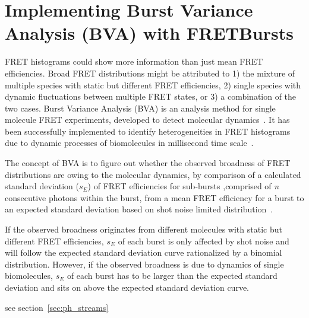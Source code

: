 \section{Implementing Burst Variance Analysis (BVA) with FRETBursts}

FRET histograms could show more information than just mean FRET efficiencies. Broad FRET distributions might be attributed to 1) the mixture of multiple species with static but different FRET efficiencies, 2) single species with dynamic fluctuations between multiple FRET states, or 3) a combination of the two cases. Burst Variance Analysis (BVA) is an analysis method for single molecule FRET experiments, developed to detect molecular dynamics~\cite{Torella_2011}. It has been successfully implemented to identify heterogeneities in FRET histograms due to dynamic processes of biomolecules in millisecond time scale~\cite{Torella_2011, Robb_2013}.

The concept of BVA is to figure out whether the observed broadness of FRET distributions are owing to the molecular dynamics, by comparison of a calculated standard deviation ($s_E$) of FRET efficiencies for sub-bursts ,comprised of \textit{n} consecutive photons within the burst, from a mean FRET efficiency for a burst to an expected standard deviation based on shot noise limited distribution~\cite{Torella_2011}. 

If the observed broadness originates from different molecules with static but different FRET efficiencies, $s_E$ of each burst is only affected by shot noise and will follow the expected standard deviation curve rationalized by a binomial distribution. However, if the observed broadness is due to dynamics of single biomolecules, $s_E$ of each burst has to be larger than the expected standard deviation and sits on above the expected standard deviation curve.  



see section~\ref{sec:ph_streams}
